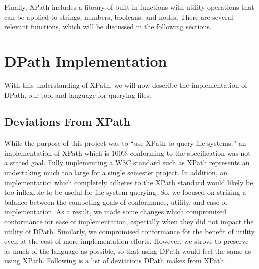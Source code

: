 \documentclass{scrartcl}
\begin{document}
Finally, XPath includes a library of built-in functions with utility operations
that can be applied to strings, numbers, booleans, and nodes. There are several
relevant functions, which will be discussed in the following sections.

\section{DPath Implementation}
\label{sec:dpath}

With this understanding of XPath, we will now describe the implementation of
DPath, our tool and language for querying files.

\subsection{Deviations From XPath}

While the purpose of this project was to ``use XPath to query file systems,'' an
implementation of XPath which is 100\% conforming to the specification was not a
stated goal. Fully implementing a W3C standard such as XPath represents an
undertaking much too large for a single semester project. In addition, an
implementation which completely adheres to the XPath standard would likely be
too inflexible to be useful for file system querying. So, we focused on
striking a balance between the competing goals of conformance, utility, and ease
of implementation. As a result, we made some changes which compromised
conformance for ease of implementation, especially when they did not impact the
utility of DPath. Similarly, we compromised conformance for the benefit of
utility even at the cost of more implementation efforts. However, we strove to
preserve as much of the language as possible, so that using DPath would feel the
same as using XPath. Following is a list of deviations DPath makes from XPath.
\end{document}
